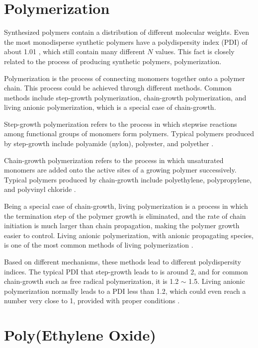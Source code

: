\section{Polymerization}

Synthesized polymers contain a distribution of different molecular weights. Even the most monodisperse synthetic polymers have a polydispersity index (PDI) of about 1.01 \cite{Thakur2016}, which still contain many different $N$ values. This fact is closely related to the process of producing synthetic polymers, polymerization.

Polymerization is the process of connecting monomers together onto a polymer chain. This process could be achieved through different methods. Common methods include step-growth polymerization, chain-growth polymerization, and living anionic polymerization, which is a special case of chain-growth. 

Step-growth polymerization refers to the process in which stepwise reactions among functional groups of monomers form polymers. Typical polymers produced by step-growth include polyamide (nylon), polyester, and polyether \cite{Carraher2003a}. 

Chain-growth polymerization refers to the process in which unsaturated monomers are added onto the active sites of a growing polymer successively. Typical polymers produced by chain-growth include polyethylene, polypropylene, and polyvinyl chloride \cite{YOUNG2017}. 

Being a special case of chain-growth, living polymerization is a process in which the termination step of the polymer growth is eliminated, and the rate of chain initiation is much larger than chain propagation, making the polymer growth easier to control. Living anionic polymerization, with anionic propagating species, is one of the most common methods of living polymerization \cite{Halasa1981}. 

Based on different mechanisms, these methods lead to different polydispersity indices. The typical PDI that step-growth leads to is around 2, and for common chain-growth such as free radical polymerization, it is 1.2 $\sim$ 1.5. Living anionic polymerization normally leads to a PDI less than 1.2, which could even reach a number very close to 1, provided with proper conditions \cite{Dotson1995}.

\section{Poly(Ethylene Oxide)}

